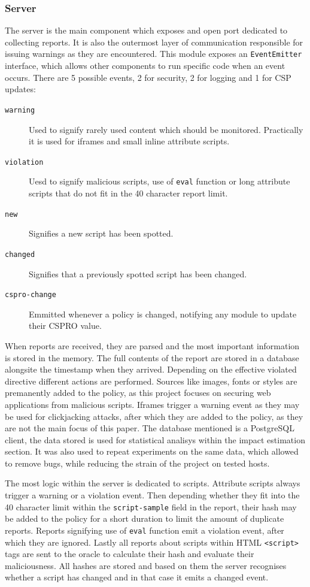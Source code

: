 \begin{description}
\subsubsection{Server}
The server is the main component which exposes and open port dedicated to collecting reports.
It is also the outermost layer of communication responsible for issuing warnings as they are encountered.
This module exposes an \texttt{EventEmitter} interface, which allows other components to run specific code when an event occurs.
There are 5 possible events, 2 for security, 2 for logging and 1 for CSP updates:
\begin{description}
	\item[\texttt{warning}]	Used to signify rarely used content which should be monitored. Practically it is used for iframes and small inline attribute scripts. 
	\item[\texttt{violation}] Uesd to signify malicious scripts, use of \texttt{eval} function or long attribute scripts that do not fit in the 40 character report limit.
	\item[\texttt{new}] Signifies a new script has been spotted.
	\item[\texttt{changed}] Signifies that a previously spotted script has been changed.
	\item[\texttt{cspro-change}] Emmitted whenever a policy is changed, notifying any module to update their CSPRO value.
\end{description}

When reports are received, they are parsed and the most important information is stored in the memory.
The full contents of the report are stored in a database alongsite the timestamp when they arrived.
Depending on the effective violated directive different actions are performed.
Sources like images, fonts or styles are premanently added to the policy, as this project focuses on securing web applications from malicious scripts.
Iframes trigger a warning event as they may be used for clickjacking attacks, after which they are added to the policy, as they are not the main focus of this paper.
The database mentioned is a PostgreSQL client, the data stored is used for statistical analisys within the impact estimation section.
It was also used to repeat experiments on the same data, which allowed to remove bugs, while reducing the strain of the project on tested hosts.

The most logic within the server is dedicated to scripts.
Attribute scripts always trigger a warning or a violation event.
Then depending whether they fit into the 40 character limit within the \texttt{script-sample} field in the report, their hash may be added to the policy for a short duration to limit the amount of duplicate reports.
Reports signifying use of \texttt{eval} function emit a violation event, after which they are ignored.
Lastly all reports about scripts within HTML \texttt{<script>} tags are sent to the oracle to calculate their hash and evaluate their maliciousness.
All hashes are stored and based on them the server recognises whether a script has changed and in that case it emits a changed event.


\end{description}
